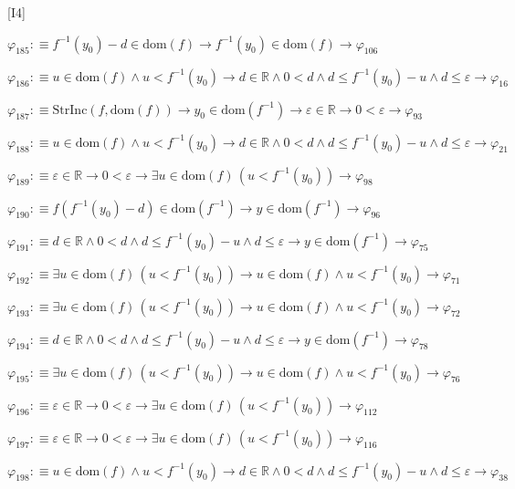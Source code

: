 \begin{fullproof}{[I4]}
\begin{abbrevlist}
\item $\varphi_{185} :\equiv f^{-1}(y_{0}) - d \in \mathrm{dom}(f) \to f^{-1}(y_{0}) \in \mathrm{dom}(f) \to \varphi_{106}$
\item $\varphi_{186} :\equiv u \in \mathrm{dom}(f) \land u < f^{-1}(y_{0}) \to d \in \mathbb{R} \land 0 < d \land d \leq f^{-1}(y_{0}) - u \land d \leq \varepsilon \to \varphi_{16}$
\item $\varphi_{187} :\equiv \mathrm{StrInc}(f,\mathrm{dom}(f)) \to y_{0} \in \mathrm{dom}(f^{-1}) \to \varepsilon \in \mathbb{R} \to 0 < \varepsilon \to \varphi_{93}$
\item $\varphi_{188} :\equiv u \in \mathrm{dom}(f) \land u < f^{-1}(y_{0}) \to d \in \mathbb{R} \land 0 < d \land d \leq f^{-1}(y_{0}) - u \land d \leq \varepsilon \to \varphi_{21}$
\item $\varphi_{189} :\equiv \varepsilon \in \mathbb{R} \to 0 < \varepsilon \to \exists u \in \mathrm{dom}(f)\,(u < f^{-1}(y_{0})) \to \varphi_{98}$
\item $\varphi_{190} :\equiv f(f^{-1}(y_{0}) - d) \in \mathrm{dom}(f^{-1}) \to y \in \mathrm{dom}(f^{-1}) \to \varphi_{96}$
\item $\varphi_{191} :\equiv d \in \mathbb{R} \land 0 < d \land d \leq f^{-1}(y_{0}) - u \land d \leq \varepsilon \to y \in \mathrm{dom}(f^{-1}) \to \varphi_{75}$
\item $\varphi_{192} :\equiv \exists u \in \mathrm{dom}(f)\,(u < f^{-1}(y_{0})) \to u \in \mathrm{dom}(f) \land u < f^{-1}(y_{0}) \to \varphi_{71}$
\item $\varphi_{193} :\equiv \exists u \in \mathrm{dom}(f)\,(u < f^{-1}(y_{0})) \to u \in \mathrm{dom}(f) \land u < f^{-1}(y_{0}) \to \varphi_{72}$
\item $\varphi_{194} :\equiv d \in \mathbb{R} \land 0 < d \land d \leq f^{-1}(y_{0}) - u \land d \leq \varepsilon \to y \in \mathrm{dom}(f^{-1}) \to \varphi_{78}$
\item $\varphi_{195} :\equiv \exists u \in \mathrm{dom}(f)\,(u < f^{-1}(y_{0})) \to u \in \mathrm{dom}(f) \land u < f^{-1}(y_{0}) \to \varphi_{76}$
\item $\varphi_{196} :\equiv \varepsilon \in \mathbb{R} \to 0 < \varepsilon \to \exists u \in \mathrm{dom}(f)\,(u < f^{-1}(y_{0})) \to \varphi_{112}$
\item $\varphi_{197} :\equiv \varepsilon \in \mathbb{R} \to 0 < \varepsilon \to \exists u \in \mathrm{dom}(f)\,(u < f^{-1}(y_{0})) \to \varphi_{116}$
\item $\varphi_{198} :\equiv u \in \mathrm{dom}(f) \land u < f^{-1}(y_{0}) \to d \in \mathbb{R} \land 0 < d \land d \leq f^{-1}(y_{0}) - u \land d \leq \varepsilon \to \varphi_{38}$

\end{abbrevlist}
\end{fullproof}
